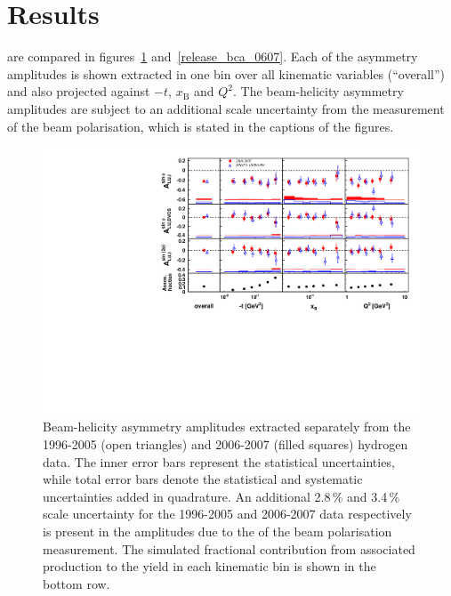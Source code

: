 \section{Results}
 are compared in figures~\ref{release_bsa_0607} and~\ref{release_bca_0607}. Each of the asymmetry amplitudes is shown extracted in one bin over all kinematic variables (``overall'') and also projected against $-t$, $x_{\textrm{B}}$ and $Q^{2}$. The beam-helicity asymmetry amplitudes are subject to an additional scale uncertainty from the measurement of the beam polarisation, which is stated in the captions of the figures.
\begin{figure}
\begin{center}
\includegraphics[width=15cm,keepaspectratio]{macros/bsa_both_morgan}
  \caption{Beam-helicity asymmetry amplitudes extracted separately from
the 1996-2005 (open triangles) and 2006-2007 (filled squares)
hydrogen data. The inner error bars represent the statistical uncertainties, while total error bars denote the statistical and systematic uncertainties added in quadrature.  
An additional 2.8\,\% and 3.4\,\% scale uncertainty for the 1996-2005 and
2006-2007 data respectively is present in the amplitudes due to the  of
the beam polarisation measurement. The simulated fractional contribution from associated production to the yield in each kinematic bin is shown in the bottom row.}
 \label{release_bsa_0607}
\end{center}
 \end{figure}

